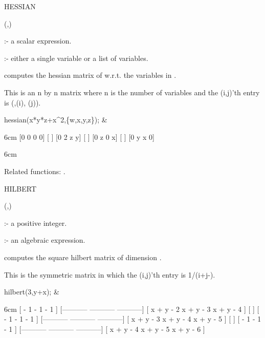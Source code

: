 \begin{Operator}[hessian]{HESSIAN}

\begin{Syntax}
(,)
\end{Syntax}

           :- a scalar expression. 

 :- either a single variable or a list of 
                         variables.

 computes the hessian matrix of  w.r.t. the 
variables in .

This is an n by n matrix where n is the number of variables and the 
(i,j)'th  entry is (,(i),
(j)).

\begin{Examples}

hessian(x*y*z+x^2,\{w,x,y,z\}); &
\begin{multilineoutput}{6cm}
[0  0  0  0]
[          ]
[0  2  z  y]
[          ]
[0  z  0  x]
[          ]
[0  y  x  0]
\end{multilineoutput}{6cm}

\end{Examples}

Related functions: .

\end{Operator}


\begin{Operator}[hilbert]{HILBERT}

\begin{Syntax}
(,)
\end{Syntax}

 :- a positive integer. 

         :- an algebraic expression.

 computes the square hilbert matrix of dimension 
. 

This is the symmetric matrix in which the (i,j)'th entry is 
1/(i+j-).

\begin{Examples}

hilbert(3,y+x); &
\begin{multilineoutput}{6cm}
[    - 1          - 1          - 1    ]
[-----------  -----------  -----------]
[ x + y - 2    x + y - 3    x + y - 4 ]
[                                     ]
[    - 1          - 1          - 1    ]
[-----------  -----------  -----------]
[ x + y - 3    x + y - 4    x + y - 5 ]
[                                     ]
[    - 1          - 1          - 1    ]
[-----------  -----------  -----------]
[ x + y - 4    x + y - 5    x + y - 6 ]
\end{multilineoutput}

\end{Examples}

\end{Operator}


